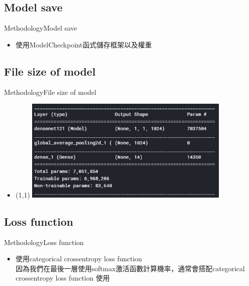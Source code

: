 \documentclass{beamer}
\begin{document}
\begin{CJK}{UTF8}{}
\subsection{Model save}

\begin{frame}{Methodology}{Model save}
	\begin{itemize}
	\item{
		使用ModelCheckpoint函式儲存框架以及權重
	}
	\end{itemize}
\end{frame}

\subsection{File size of model}

\begin{frame}{Methodology}{File size of model}
\vspace{-4.5cm}
	\begin{itemize}
	\item{
		\begin{textblock}{3}(1,1)
		\includegraphics[width=10cm]{file_size_of_model.png}
		\end{textblock}
	}
	\end{itemize}
\end{frame}

\subsection{Loss function}

\begin{frame}{Methodology}{Loss function}
	\begin{itemize}
	\item{
		使用categorical crossentropy loss function\\
		因為我們在最後一層使用softmax激活函數計算機率，通常會搭配categorical crossentropy loss function 使用\\　
	}
	\end{itemize}
\end{frame}


\end{CJK}
\end{document}
